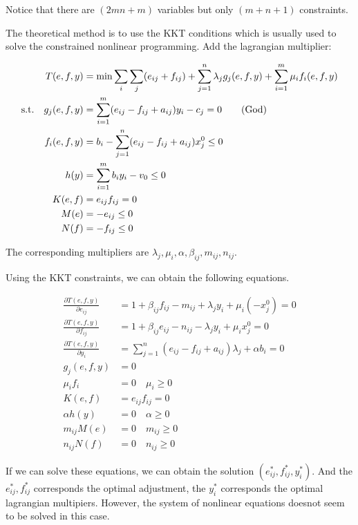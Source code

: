 \documentclass[UTF8]{article}
\numberwithin{equation}{section}
\begin{document}
Notice that there are $(2mn+m)$ variables but only $(m+n+1)$ constraints.

The theoretical method is to use the KKT conditions which is usually used to solve the constrained nonlinear programming.
Add the lagrangian multiplier:

\begin{align}
  T(e,f,y) &= \min \sum_i\sum_j(e_{ij}+f_{ij}) + \sum_{j=1}^n \lambda_j
  g_j(e,f,y) + \sum_{i=1}^m \mu_i f_i(e,f,y)\nonumber\\
\mathrm{s.t.}  \quad   g_j(e,f,y) &= \sum_{i=1}^m (e_{ij}-f_{ij}+a_{ij})y_i-c_j = 0 \tag{\text{God}} \\
  f_i(e,f,y) &= b_i - \sum_{j=1}^n (e_{ij}-f_{ij}+a_{ij})x_j^0 \leq 0 \\
  h(y) &= \sum_{i=1}^m b_i y_i - v_0 \leq 0\\
  K(e,f) &= e_{ij}f_{ij}=0  \\
  M(e) &= -e_{ij} \leq 0 \label{M}  \\
  N(f) &= -f_{ij} \leq 0
\end{align}

The corresponding multipliers are $\lambda_j, \mu_i, \alpha, \beta_{ij}, m_{ij}, n_{ij}$.

Using the KKT constraints, we can obtain the following equations.

\begin{align*}
  \frac{\partial T(e,f,y)}{\partial e_{ij}} &= 1+ \beta_{ij} f_{ij} - m_{ij}+\lambda_j y_i + \mu_i(-x_j^0) = 0  \\
  \frac{\partial T(e,f,y)}{\partial f_{ij}} &= 1+ \beta_{ij} e_{ij} - n_{ij}-\lambda_j y_i + \mu_i x_j^0 = 0   \\
  \frac{\partial T(e,f,y)}{\partial y_{i}} &=\sum_{j=1}^n(e_{ij}-f_{ij}+a_{ij})\lambda_j + \alpha b_i = 0 \\
  g_j(e,f,y) &=0 \\
  \mu_i f_i &= 0 \quad \mu_i \geq 0 \\
  K(e,f) &= e_{ij}f_{ij} =0 \\
  \alpha h(y) &=0 \quad \alpha \geq 0\\
  m_{ij} M(e) &=0 \quad m_{ij} \geq 0 \\
  n_{ij} N(f) &=0 \quad n_{ij} \geq 0
\end{align*}

If we can solve these equations, we can obtain the solution $(e_{ij}^*, f_{ij}^*, y_i^*)$. And the $e_{ij}^*, f_{ij}^*$ corresponds the optimal adjustment, the $y_i^*$ corresponds the optimal lagrangian multipiers.
However, the system of nonlinear equations doesnot seem to be solved in this case.
\end{document}
